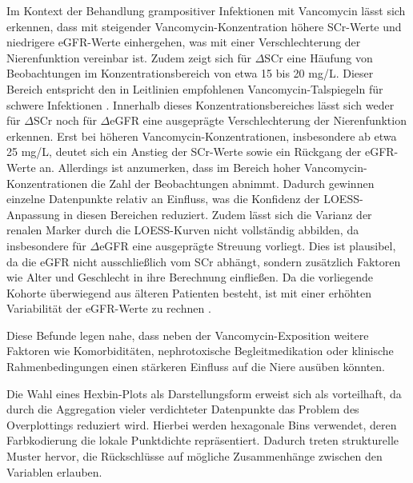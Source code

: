 \documentclass[a4paper,12pt]{article}
\begin{document}
Im Kontext der Behandlung grampositiver Infektionen mit Vancomycin lässt sich erkennen, dass mit steigender Vancomycin-Konzentration höhere SCr-Werte und niedrigere eGFR-Werte einhergehen, was mit einer Verschlechterung der Nierenfunktion vereinbar ist. Zudem zeigt sich für $\Delta$SCr eine Häufung von Beobachtungen im Konzentrationsbereich von etwa 15 bis 20 mg/L. Dieser Bereich entspricht den in Leitlinien empfohlenen Vancomycin-Talspiegeln für schwere Infektionen \citep{pais2020vancomycin}. Innerhalb dieses Konzentrationsbereiches lässt sich weder für $\Delta$SCr noch für $\Delta$eGFR eine ausgeprägte Verschlechterung der Nierenfunktion erkennen. Erst bei höheren Vancomycin-Konzentrationen, insbesondere ab etwa 25 mg/L, deutet sich ein Anstieg der SCr-Werte sowie ein Rückgang der eGFR-Werte an. Allerdings ist anzumerken, dass im Bereich hoher Vancomycin-Konzentrationen die Zahl der Beobachtungen abnimmt. Dadurch gewinnen einzelne Datenpunkte relativ an Einfluss, was die Konfidenz der LOESS-Anpassung in diesen Bereichen reduziert. Zudem lässt sich die Varianz der renalen Marker durch die LOESS-Kurven nicht vollständig abbilden, da insbesondere für $\Delta$eGFR eine ausgeprägte Streuung vorliegt. Dies ist plausibel, da die eGFR nicht ausschließlich vom SCr abhängt, sondern zusätzlich Faktoren wie Alter und Geschlecht in ihre Berechnung einfließen. Da die vorliegende Kohorte überwiegend aus älteren Patienten besteht, ist mit einer erhöhten Variabilität der eGFR-Werte zu rechnen \citep{kan2022vancomycin}. 

Diese Befunde legen nahe, dass neben der Vancomycin-Exposition weitere Faktoren wie Komorbiditäten, nephrotoxische Begleitmedikation oder klinische Rahmenbedingungen einen stärkeren Einfluss auf die Niere ausüben könnten.

Die Wahl eines Hexbin-Plots als Darstellungsform erweist sich als vorteilhaft, da durch die Aggregation vieler verdichteter Datenpunkte das Problem des Overplottings reduziert wird. Hierbei werden hexagonale Bins verwendet, deren Farbkodierung die lokale Punktdichte repräsentiert. Dadurch treten strukturelle Muster hervor, die Rückschlüsse auf mögliche Zusammenhänge zwischen den Variablen erlauben. 

\end{document}
